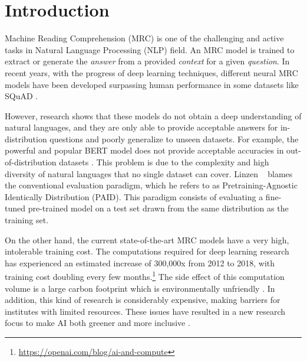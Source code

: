 \documentclass[review]{elsarticle}
\begin{document}
\nolinenumbers
\section{Introduction}

Machine Reading Comprehension (MRC) is one of the challenging and active tasks in Natural Language Processing (NLP) field. An MRC model is trained to extract or generate the \textit{answer} from a provided \textit{context} for a given \textit{question}. In recent years, with the progress of deep learning techniques, different neural MRC models have been developed \cite{RN238,yang2019xlnet,devlin2018bert}
surpassing human performance in some datasets like SQuAD \citep{RN22}. 

However, research shows that these models do not obtain a deep understanding of natural languages, and they are only able to provide acceptable answers for in-distribution questions and poorly generalize to unseen datasets. For example, the powerful and popular BERT model \cite{devlin2018bert} does not provide acceptable accuracies in out-of-distribution datasets \citep{talmor-berant-2019-multiqa}. This problem is due to the complexity and high diversity of natural languages that no single dataset can cover. Linzen ~\cite{linzen-2020-accelerate} blames the conventional evaluation paradigm, which he refers to as Pretraining-Agnostic Identically Distribution (PAID). This paradigm consists of evaluating a fine-tuned pre-trained model on a test set drawn from the same distribution as the training set. 


On the other hand, the current state-of-the-art MRC models have a very high, intolerable training cost. The computations required for deep learning research has experienced an estimated increase of 300,000x from 2012 to 2018, with training cost doubling every few months.\footnote{\url{https://openai.com/blog/ai-and-compute}} The side effect of this computation volume is a large carbon footprint which is environmentally unfriendly \citep{strubell2019energy}. In addition, this kind of research is considerably expensive, making barriers for institutes with limited resources. These issues have resulted in a new research focus to make AI both greener and more inclusive \citep{RN212}.

\end{document}
